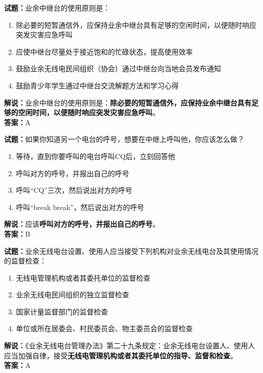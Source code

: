 \documentclass{ctexbook}
\begin{document}
\bigskip




\noindent\textbf{试题：}业余中继台的使用原则是：
\begin{enumerate}[leftmargin=3em]
\item 除必要的短暂通信外，应保持业余中继台具有足够的空闲时间，以便随时响应突发灾害应急呼叫
\item 应使中继台尽量处于接近饱和的忙碌状态，提高使用效率
\item 鼓励业余无线电民间组织（协会）通过中继台向当地会员发布通知
\item 鼓励青少年学生通过中继台交流解题方法和学习心得
\end{enumerate}
\noindent\textbf{解说：}业余中继台的使用原则是：\textbf{除必要的短暂通信外，应保持业余中继台具有足够的空闲时间，以便随时响应突发灾害应急呼叫}。\\\noindent\textbf{答案：}A

\bigskip




\noindent\textbf{试题：}如果你知道另一个电台的呼号，想要在中继上呼叫他，你应该怎么做？
\begin{enumerate}[leftmargin=3em]
\item 等待，直到你要呼叫的电台呼叫CQ后，立刻回答他
\item 呼叫对方的呼号，并报出自己的呼号
\item 呼叫“CQ”三次，然后说出对方的呼号
\item 呼叫“break break”，然后说出对方的呼号
\end{enumerate}
\noindent\textbf{解说：}应该\textbf{呼叫对方的呼号，并报出自己的呼号}。\\\noindent\textbf{答案：}B

\bigskip




\noindent\textbf{试题：}业余无线电台设置、使用人应当接受下列机构对业余无线电台及其使用情况的监督检查：
\begin{enumerate}[leftmargin=3em]
\item 无线电管理机构或者其委托单位的监督检查
\item 业余无线电民间组织的独立监督检查
\item 国家计量监督部门的监督检查
\item 单位或所在居委会、村民委员会、物主委员会的监督检查
\end{enumerate}
\noindent\textbf{解说：}《业余无线电台管理办法》第二十九条规定：业余无线电台设置人、使用人应当加强自律，接受\textbf{无线电管理机构或者其委托单位的指导、监督和检查}。\\\noindent\textbf{答案：}A
\end{document}
